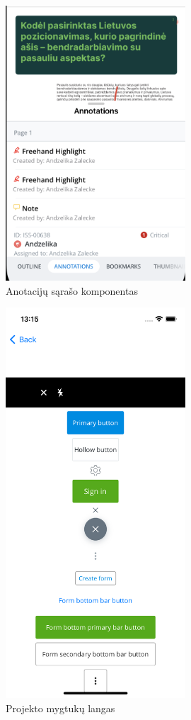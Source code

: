 \documentclass{VUMIFPSPraktika}
\begin{document}
\begin{figure}[htbp!]
    \centering
    \includegraphics[width=0.6\textwidth]{Images/annotationList.png}
    \caption{Anotacijų sąrašo komponentas}
    \label{img:annotationList}
\end{figure}

\begin{figure}[htbp!]
    \centering
    \includegraphics[width=0.6\textwidth]{Images/buttonsView.png}
    \caption{Projekto mygtukų langas}
    \label{fig:buttonsView.png}
\end{figure}
\end{document}
